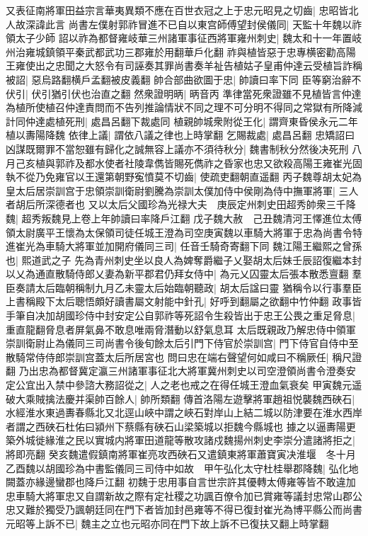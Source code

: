 又表征南將軍田益宗言華夷異類不應在百世衣冠之上于忠元昭見之切齒|{
	忠昭皆北人故深諱此言}
尚書左僕射郭祚冒進不已自以東宫師傅望封侯儀同|{
	天監十年魏以祚領太子少師}
詔以祚為都督雍岐華三州諸軍事征西將軍雍州刺史|{
	魏太和十一年置岐州治雍城鎮領平秦武都武功三郡雍於用翻華戶化翻}
祚與植皆惡于忠專横密勸高陽王雍使出之忠聞之大怒令有司誣奏其罪尚書奏羊祉告植姑子皇甫仲達云受植旨詐稱被詔|{
	惡烏路翻横戶孟翻被皮義翻}
帥合部曲欲圖于忠|{
	帥讀曰率下同}
臣等窮治辭不伏引|{
	伏引猶引伏也治直之翻}
然衆證明昞|{
	昞音丙}
準律當死衆證雖不見植皆言仲達為植所使植召仲達責問而不告列推論情狀不同之理不可分明不得同之常獄有所降減計同仲達處植死刑|{
	處昌呂翻下裁處同}
植親帥城衆附從王化|{
	謂齊東昏侯永元二年植以夀陽降魏}
依律上議|{
	謂依八議之律也上時掌翻}
乞賜裁處|{
	處昌呂翻}
忠矯詔曰凶謀既爾罪不當恕雖有歸化之誠無容上議亦不須待秋分|{
	魏書制秋分然後决死刑}
八月己亥植與郭祚及都水使者社陵韋儁皆賜死儁祚之昏家也忠又欲殺高陽王雍崔光固執不從乃免雍官以王還第朝野寃憤莫不切齒|{
	使疏吏翻朝直遥翻}
丙子魏尊胡太妃為皇太后居崇訓宫于忠領崇訓衛尉劉騰為崇訓太僕加侍中侯剛為侍中撫軍將軍|{
	三人者胡后所深德者也}
又以太后父國珍為光禄大夫　庚辰定州刺史田超秀帥衆三千降魏|{
	超秀叛魏見上卷上年帥讀曰率降戶江翻}
戊子魏大赦　己丑魏清河王懌進位太傅領太尉廣平王懷為太保領司徒任城王澄為司空庚寅魏以車騎大將軍于忠為尚書令特進崔光為車騎大將軍並加開府儀同三司|{
	任音壬騎奇寄翻下同}
魏江陽王繼熙之曾孫也|{
	熙道武之子}
先為青州刺史坐以良人為婢奪爵繼子乂娶胡太后妹壬辰詔復繼本封以乂為通直散騎侍郎乂妻為新平郡君仍拜女侍中|{
	為元乂囚靈太后張本散悉亶翻}
羣臣奏請太后臨朝稱制九月乙未靈太后始臨朝聽政|{
	胡太后諡曰靈}
猶稱令以行事羣臣上書稱殿下太后聰悟頗好讀書屬文射能中針孔|{
	好呼到翻屬之欲翻中竹仲翻}
政事皆手筆自决加胡國珍侍中封安定公自郭祚等死詔令生殺皆出于忠王公畏之重足脅息|{
	重直龍翻脅息者屏氣鼻不敢息唯兩脅潛動以舒氣息耳}
太后既親政乃解忠侍中領軍崇訓衛尉止為儀同三司尚書令後旬餘太后引門下侍官於崇訓宫|{
	門下侍官自侍中至散騎常侍侍郎崇訓宫蓋太后所居宮也}
問曰忠在端右聲望何如咸曰不稱厥任|{
	稱尺證翻}
乃出忠為都督冀定瀛三州諸軍事征北大將軍冀州刺史以司空澄領尚書令澄奏安定公宜出入禁中參諮大務詔從之|{
	人之老也戒之在得任城王澄血氣衰矣}
甲寅魏元遥破大乘賊擒法慶并渠帥百餘人|{
	帥所類翻}
傳首洛陽左遊擊將軍趙祖悦襲魏西硤石|{
	水經淮水東過夀春縣北又北逕山峽中謂之峽石對岸山上結二城以防津要在淮水西岸者謂之西硤石杜佑曰潁州下蔡縣有硤石山梁築城以拒魏今縣城也}
據之以逼夀陽更築外城徙緣淮之民以實城内將軍田道龍等散攻諸戍魏揚州刺史李崇分遣諸將拒之|{
	將即亮翻}
癸亥魏遣假鎮南將軍崔亮攻西硤石又遣鎮東將軍蕭寶寅决淮堰　冬十月乙酉魏以胡國珍為中書監儀同三司侍中如故　甲午弘化太守杜桂舉郡降魏|{
	弘化地闕蓋亦緣邊蠻郡也降戶江翻}
初魏于忠用事自言世宗許其優轉太傅雍等皆不敢違加忠車騎大將軍忠又自謂新故之際有定社稷之功諷百僚令加已賞雍等議封忠常山郡公忠又難於獨受乃諷朝廷同在門下者皆加封邑雍等不得已復封崔光為博平縣公而尚書元昭等上訴不已|{
	魏主之立也元昭亦同在門下故上訴不已復扶又翻上時掌翻}
